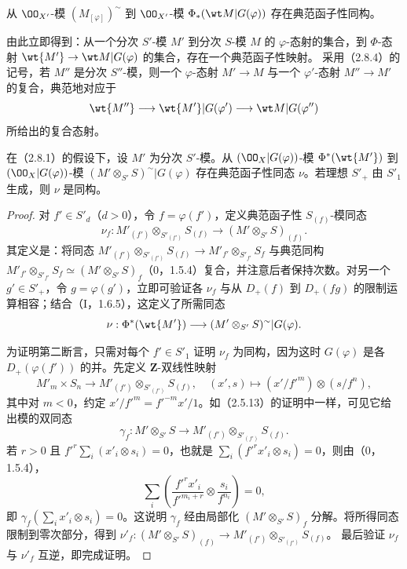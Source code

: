 从 $\OO_{X'}$-模 $(M_{[\varphi]})^\sim$ 到 $\OO_{X'}$-模
$\Phi_*(\wt M|G(\varphi))$ 存在典范函子性同构。

由此立即得到：从一个分次 $S'$-模 $M'$ 到分次 $S$-模 $M$ 的 $\varphi$-态射的集合，到
$\Phi$-态射 $\wt{M'}\to\wt M|G(\varphi)$ 的集合，存在一个典范函子性映射。
采用（2.8.4）的记号，若 $M''$ 是分次 $S''$-模，则一个 $\varphi$-态射 $M'\to M$ 与一个 $\varphi'$-态射 $M''\to M'$ 的复合，典范地对应于
\[
\wt{M''}\longrightarrow\wt{M'}|G(\varphi')
\longrightarrow\wt M|G(\varphi'')
\]
所给出的复合态射。

在（2.8.1）的假设下，设 $M'$ 为分次 $S'$-模。从 $(\OO_X|G(\varphi))$-模
$\Phi^*(\wt{M'})$ 到 $(\OO_X|G(\varphi))$-模
$(M'\otimes_{S'}S)^\sim|G(\varphi)$ 存在典范函子性同态 $\nu$。若理想 $S'_+$ 由 $S'_1$ 生成，则 $\nu$ 是同构。
\begin{proof}
对 $f'\in S'_d$（$d>0$），令 $f=\varphi(f')$，定义典范函子性 $S_{(f)}$-模同态
\begin{equation}\tag{2.8.8.1}
\nu_f:M'_{(f')}\otimes_{S'_{(f')}}S_{(f)}
\longrightarrow(M'\otimes_{S'}S)_{(f)}.
\end{equation}
其定义是：将同态
$M'_{(f')}\otimes_{S'_{(f')}}S_{(f)}\to M'_{f'}\otimes_{S'_{f'}}S_f$
与典范同构
$M'_{f'}\otimes_{S'_{f'}}S_f\simeq(M'\otimes_{S'}S)_f$（0，1.5.4）复合，并注意后者保持次数。对另一个 $g'\in S'_+$，令 $g=\varphi(g')$，立即可验证各 $\nu_f$ 与从 $D_+(f)$ 到 $D_+(fg)$ 的限制运算相容；结合（I，1.6.5），这定义了所需同态
\[
\nu:\Phi^*(\wt{M'})\longrightarrow(M'\otimes_{S'}S)^\sim|G(\varphi).
\]

为证明第二断言，只需对每个 $f'\in S'_1$ 证明 $\nu_f$ 为同构，因为这时 $G(\varphi)$ 是各 $D_+(\varphi(f'))$ 的并。先定义 $\mathbf Z$-双线性映射
\[
M'_m\times S_n\longrightarrow M'_{(f')}\otimes_{S'_{(f')}}S_{(f)},
\quad(x',s)\longmapsto(x'/f'^m)\otimes(s/f^n),
\]
其中对 $m<0$，约定 $x'/f'^m=f'^{-m}x'/1$。如（2.5.13）的证明中一样，可见它给出模的双同态
\[
\gamma_f:M'\otimes_{S'}S\longrightarrow
M'_{(f')}\otimes_{S'_{(f')}}S_{(f)}.
\]
若 $r>0$ 且 $f'^r\sum_i(x'_i\otimes s_i)=0$，也就是
$\sum_i(f'^rx'_i\otimes s_i)=0$，则由（0，1.5.4），
\[
\sum_i\left(\frac{f'^rx'_i}{f'^{m_i+r}}\otimes\frac{s_i}{f^{n_i}}\right)=0,
\]
即 $\gamma_f(\sum_i x'_i\otimes s_i)=0$。这说明 $\gamma_f$ 经由局部化
$(M'\otimes_{S'}S)_f$ 分解。将所得同态限制到零次部分，得到
$\nu'_f:(M'\otimes_{S'}S)_{(f)}\to M'_{(f')}\otimes_{S'_{(f')}}S_{(f)}$。
最后验证 $\nu_f$ 与 $\nu'_f$ 互逆，即完成证明。
\end{proof}

